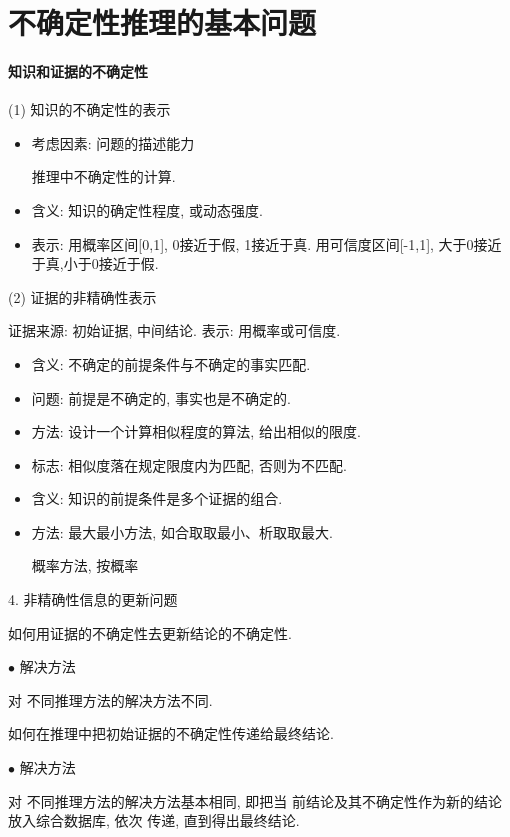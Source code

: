 \section{不确定性推理的基本问题 }\label{AI32C6Sec6.2}
\paragraph{知识和证据的不确定性}

(1) 知识的不确定性的表示
\begin{itemize}
\item 考虑因素: 问题的描述能力

      推理中不确定性的计算.

\item 含义: 知识的确定性程度, 或动态强度.
\item 表示: 用概率区间[0,1], 0接近于假, 1接近于真. 用可信度区间[-1,1], 大于0接近于真,小于0接近于假.
\end{itemize}

(2) 证据的非精确性表示

    证据来源: 初始证据, 中间结论.
    表示: 用概率或可信度.
\begin{itemize}
\item 含义: 不确定的前提条件与不确定的事实匹配.
\item 问题: 前提是不确定的, 事实也是不确定的.
\item 方法: 设计一个计算相似程度的算法, 给出相似的限度.
\item 标志: 相似度落在规定限度内为匹配, 否则为不匹配.
\item 含义: 知识的前提条件是多个证据的组合.
\item 方法: 最大最小方法, 如合取取最小、析取取最大.

    概率方法, 按概率
\end{itemize}

4. 非精确性信息的更新问题

   \qquad {} 如何用证据的不确定性去更新结论的不确定性.

    $\bullet$ 解决方法

   \qquad  对 不同推理方法的解决方法不同.

   \qquad  {} 如何在推理中把初始证据的不确定性传递给最终结论.

    $\bullet$ 解决方法

   \qquad  对 不同推理方法的解决方法基本相同, 即把当 前结论及其不确定性作为新的结论放入综合数据库, 依次 传递, 直到得出最终结论.

